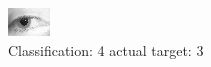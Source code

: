 \begin{figure}[h!]
\begin{center}
\includegraphics[width=0.60\columnwidth]{figures/ID1326_class_4_target_3.png}
\end{center}
\caption{ Classification: 4 actual target: 3}
\label{fig:ID1326_class_4_target_3}
\end{figure}
